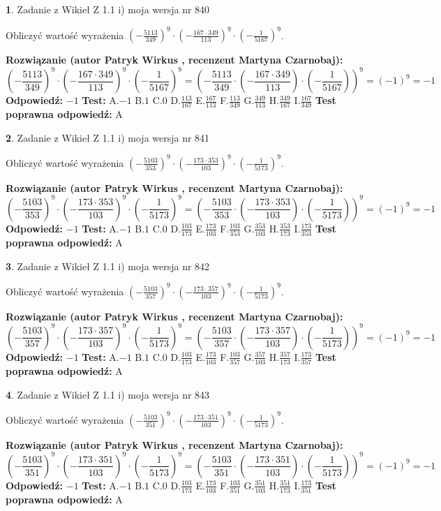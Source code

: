 \documentclass[12pt, a4paper]{article}
\theoremstyle{definition} %
\newtheorem{zad}{}
\newcommand{\zadStart}[1]{\begin{zad}#1\newline}
\newcommand{\zadStop}{\end{zad}}
\newcommand{\rozwStart}[2]{\noindent \textbf{Rozwiązanie (autor #1 , recenzent #2): }\newline}
\newcommand{\rozwStop}{\newline}
\newcommand{\odpStart}{\noindent \textbf{Odpowiedź:}\newline}
\newcommand{\odpStop}{\newline}
\newcommand{\testStart}{\noindent \textbf{Test:}\newline}
\newcommand{\testStop}{\newline}
\newcommand{\kluczStart}{\noindent \textbf{Test poprawna odpowiedź:}\newline}
\newcommand{\kluczStop}{\newline}
\begin{document}
\zadStart{Zadanie z Wikieł Z 1.1 i) moja wersja nr 840}

Obliczyć wartość wyrażenia $(-\frac{5113}{349})^{9} \cdot (-\frac{167 \cdot 349}{113})^{9} \cdot (-\frac{1}{5167})^{9}$.
\zadStop
\rozwStart{Patryk Wirkus}{Martyna Czarnobaj}
$$(-\frac{5113}{349})^{9} \cdot (-\frac{167 \cdot 349}{113})^{9} \cdot (-\frac{1}{5167})^{9} = (-\frac{5113}{349} \cdot (-\frac{167 \cdot 349}{113}) \cdot (-\frac{1}{5167}))^{9} = (-1)^{9} = -1$$
\rozwStop
\odpStart
$-1$
\odpStop
\testStart
A.$-1$ B.$1$ C.$0$ D.$\frac{113}{167}$ E.$\frac{167}{113}$
F.$\frac{113}{349}$ G.$\frac{349}{113}$
H.$\frac{349}{167}$
I.$\frac{167}{349}$
\testStop
\kluczStart
A
\kluczStop



\zadStart{Zadanie z Wikieł Z 1.1 i) moja wersja nr 841}

Obliczyć wartość wyrażenia $(-\frac{5103}{353})^{9} \cdot (-\frac{173 \cdot 353}{103})^{9} \cdot (-\frac{1}{5173})^{9}$.
\zadStop
\rozwStart{Patryk Wirkus}{Martyna Czarnobaj}
$$(-\frac{5103}{353})^{9} \cdot (-\frac{173 \cdot 353}{103})^{9} \cdot (-\frac{1}{5173})^{9} = (-\frac{5103}{353} \cdot (-\frac{173 \cdot 353}{103}) \cdot (-\frac{1}{5173}))^{9} = (-1)^{9} = -1$$
\rozwStop
\odpStart
$-1$
\odpStop
\testStart
A.$-1$ B.$1$ C.$0$ D.$\frac{103}{173}$ E.$\frac{173}{103}$
F.$\frac{103}{353}$ G.$\frac{353}{103}$
H.$\frac{353}{173}$
I.$\frac{173}{353}$
\testStop
\kluczStart
A
\kluczStop



\zadStart{Zadanie z Wikieł Z 1.1 i) moja wersja nr 842}

Obliczyć wartość wyrażenia $(-\frac{5103}{357})^{9} \cdot (-\frac{173 \cdot 357}{103})^{9} \cdot (-\frac{1}{5173})^{9}$.
\zadStop
\rozwStart{Patryk Wirkus}{Martyna Czarnobaj}
$$(-\frac{5103}{357})^{9} \cdot (-\frac{173 \cdot 357}{103})^{9} \cdot (-\frac{1}{5173})^{9} = (-\frac{5103}{357} \cdot (-\frac{173 \cdot 357}{103}) \cdot (-\frac{1}{5173}))^{9} = (-1)^{9} = -1$$
\rozwStop
\odpStart
$-1$
\odpStop
\testStart
A.$-1$ B.$1$ C.$0$ D.$\frac{103}{173}$ E.$\frac{173}{103}$
F.$\frac{103}{357}$ G.$\frac{357}{103}$
H.$\frac{357}{173}$
I.$\frac{173}{357}$
\testStop
\kluczStart
A
\kluczStop



\zadStart{Zadanie z Wikieł Z 1.1 i) moja wersja nr 843}

Obliczyć wartość wyrażenia $(-\frac{5103}{351})^{9} \cdot (-\frac{173 \cdot 351}{103})^{9} \cdot (-\frac{1}{5173})^{9}$.
\zadStop
\rozwStart{Patryk Wirkus}{Martyna Czarnobaj}
$$(-\frac{5103}{351})^{9} \cdot (-\frac{173 \cdot 351}{103})^{9} \cdot (-\frac{1}{5173})^{9} = (-\frac{5103}{351} \cdot (-\frac{173 \cdot 351}{103}) \cdot (-\frac{1}{5173}))^{9} = (-1)^{9} = -1$$
\rozwStop
\odpStart
$-1$
\odpStop
\testStart
A.$-1$ B.$1$ C.$0$ D.$\frac{103}{173}$ E.$\frac{173}{103}$
F.$\frac{103}{351}$ G.$\frac{351}{103}$
H.$\frac{351}{173}$
I.$\frac{173}{351}$
\testStop
\kluczStart
A
\kluczStop
\end{document}
